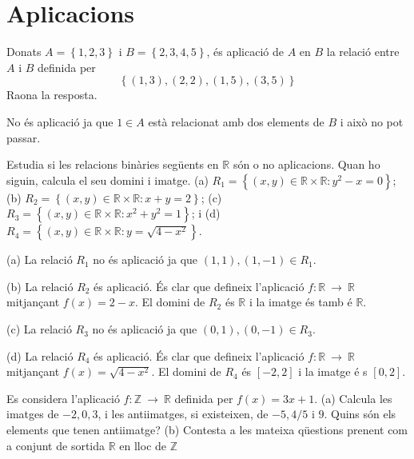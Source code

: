 \section{Aplicacions}

\begin{exercici}
Donats $A=\left\{ 1,2,3\right\} $ i $B=\left\{ 2,3,4,5\right\} $, \'{e}s
aplicaci\'{o} de $A$ en $B$ la relaci\'{o} entre $A$ i $B$ definida per%
\begin{equation*}
\left\{ (1,3),(2,2),(1,5),(3,5)\right\}
\end{equation*}%
Raona la resposta.
\end{exercici}

\begin{solucio}
No \'{e}s aplicaci\'{o} ja que $1\in A$ est\`{a} relacionat amb dos elements
de $B$ i aix\`{o} no pot passar.
\end{solucio}

\begin{exercici}
Estudia si les relacions bin\`{a}ries seg\"{u}ents en $\mathbb{R}$ s\'{o}n o
no aplicacions. Quan ho siguin, calcula el seu domini i imatge. (a) $%
R_{1}=\left\{ (x,y)\in \mathbb{R}\times \mathbb{R}:y^{2}-x=0\right\} $; (b) $%
R_{2}=\left\{ (x,y)\in \mathbb{R}\times \mathbb{R}:x+y=2\right\} $; (c) $%
R_{3}=\left\{ (x,y)\in \mathbb{R}\times \mathbb{R}:x^{2}+y^{2}=1\right\} $;
i (d) $R_{4}=\left\{ (x,y)\in \mathbb{R}\times \mathbb{R}:y=\sqrt{4-x^{2}}%
\right\} $.
\end{exercici}

\begin{solucio}
(a) La relaci\'{o} $R_{1}$ no \'{e}s aplicaci\'{o} ja que $(1,1),(1,-1)\in
R_{1}$.

(b) La relaci\'{o} $R_{2}$ \'{e}s aplicaci\'{o}. \'{E}s clar que defineix
l'aplicaci\'{o} $f:\mathbb{R}~\longrightarrow ~\mathbb{R}$ mitjan\c{c}ant $%
f(x)=2-x$. El domini de $R_{2}$ \'{e}s $\mathbb{R}$ i la imatge \'{e}s tamb%
\'{e} $\mathbb{R}$.

(c) La relaci\'{o} $R_{3}$ no \'{e}s aplicaci\'{o} ja que $(0,1),(0,-1)\in
R_{3}$.

(d) La relaci\'{o} $R_{4}$ \'{e}s aplicaci\'{o}. \'{E}s clar que defineix
l'aplicaci\'{o} $f:\mathbb{R}~\longrightarrow ~\mathbb{R}$ mitjan\c{c}ant $%
f(x)=\sqrt{4-x^{2}}$. El domini de $R_{4}$ \'{e}s $[-2,2]$ i la imatge \'{e}%
s $[0,2]$.
\end{solucio}

\begin{exercici}
Es considera l'aplicaci\'{o} $f:\mathbb{Z}~\longrightarrow ~\mathbb{R}$
definida per $f(x)=3x+1$. (a) Calcula les imatges de $-2,0,3$, i les
antiimatges, si existeixen, de $-5,4/5$ i $9$. Quins s\'{o}n els elements
que tenen antiimatge? (b) Contesta a les mateixa q\"{u}estions prenent com a
conjunt de sortida $\mathbb{R}$ en lloc de $\mathbb{Z}$
\end{exercici}

